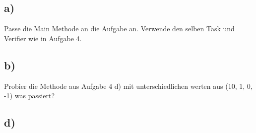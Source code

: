 \subsection*{a)}
	Passe die Main Methode an die Aufgabe an. Verwende den selben Task und Verifier wie in Aufgabe 4.
\subsection*{b)}
	Probier die Methode aus Aufgabe 4 d) mit unterschiedlichen werten aus (10, 1, 0, -1) was passiert?
\subsection*{d)}